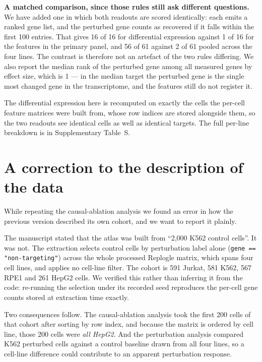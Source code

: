 \documentclass[11pt]{article}
\begin{document}
\textbf{A matched comparison, since those rules still ask different questions.} We have added one
in which both readouts are scored identically: each emits a ranked gene list, and the perturbed gene
counts as recovered if it falls within the first 100 entries. That gives 16 of 16 for differential
expression against 1 of 16 for the features in the primary panel, and 56 of 61 against 2 of 61
pooled across the four lines. The contrast is therefore not an artefact of the two rules differing.
We also report the median rank of the perturbed gene among all measured genes by effect size, which
is 1 --- in the median target the perturbed gene is the single most changed gene in the
transcriptome, and the features still do not register it.

The differential expression here is recomputed on exactly the cells the per-cell feature matrices
were built from, whose row indices are stored alongside them, so the two readouts see identical
cells as well as identical targets. The full per-line breakdown is in
Supplementary Table~S.

\section*{A correction to the description of the data}

While repeating the causal-ablation analysis we found an error in how the previous version
described its own cohort, and we want to report it plainly.

The manuscript stated that the atlas was built from ``2,000 K562 control cells''. It was not. The
extraction selects control cells by perturbation label alone (\texttt{gene == "non-targeting"})
across the whole processed Replogle matrix, which spans four cell lines, and applies no cell-line
filter. The cohort is 591 Jurkat, 581 K562, 567 RPE1 and 261 HepG2 cells. We verified this rather
than inferring it from the code: re-running the selection under its recorded seed reproduces the
per-cell gene counts stored at extraction time exactly.

Two consequences follow. The causal-ablation analysis took the first 200 cells of that cohort after
sorting by row index, and because the matrix is ordered by cell line, those 200 cells were
\emph{all HepG2}. And the perturbation analysis compared K562 perturbed cells against a control
baseline drawn from all four lines, so a cell-line difference could contribute to an apparent
perturbation response.
\end{document}
